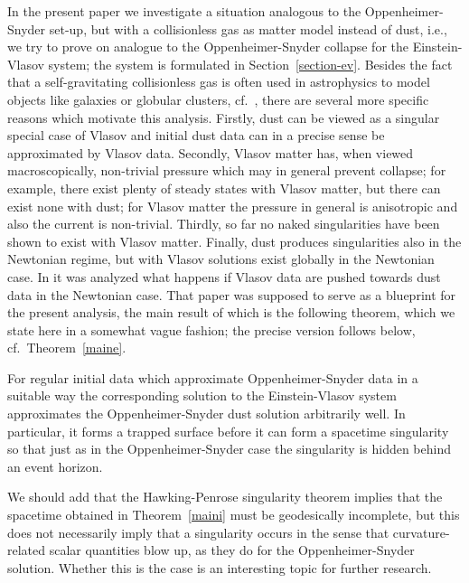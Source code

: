 \documentclass[11pt]{article}
\begin{document}
In the present paper we 
investigate a situation analogous to the Oppenheimer-Snyder
set-up, but with a collisionless gas as matter
model instead of dust, i.e., we try to prove on analogue
to the Oppenheimer-Snyder collapse for the Einstein-Vlasov system;
the system is formulated in Section~\ref{section-ev}.
Besides the fact that a self-gravitating collisionless gas is often used in
astrophysics to model objects like galaxies or globular clusters,
cf.~\cite{BT},
there are several more specific reasons which motivate this analysis.
Firstly, dust can be viewed as a
singular special case of Vlasov and initial dust data can in
a precise sense be approximated
by Vlasov data. Secondly, Vlasov matter has, when viewed macroscopically,
non-trivial pressure which may in general prevent collapse;
for example, there exist plenty of steady states
with Vlasov matter, but there can exist none with dust;
for Vlasov matter the pressure in general is anisotropic and also
the current is non-trivial.
Thirdly, so far no naked singularities
have been shown to exist with Vlasov matter.
Finally, dust produces singularities also in the Newtonian
regime, but with Vlasov solutions exist globally in the Newtonian
case. In \cite{RT} it was analyzed what happens if Vlasov data
are pushed towards dust data in the Newtonian case. That paper
was supposed to serve as a blueprint for the present analysis,
the main result of which is the following theorem, which we state
here in a somewhat vague fashion; the precise version follows below,
cf.~Theorem~\ref{maine}.

\begin{theorem}\label{maini}
  For regular initial data which approximate Oppenheimer-Snyder
  data in a suitable way 
  the corresponding solution to the Einstein-Vlasov system approximates the
  Oppenheimer-Snyder dust solution arbitrarily well. In particular, it forms
  a trapped surface before
  it can form a spacetime singularity so that just as
  in the Oppenheimer-Snyder case
  the singularity is hidden behind an event horizon.
\end{theorem}

We should add that the Hawking-Penrose singularity theorem \cite{pen}
implies that the spacetime obtained in Theorem~\ref{maini} must be geodesically
incomplete, but this does not necessarily imply that a singularity
occurs in the sense that curvature-related scalar quantities blow up,
as they do for the Oppenheimer-Snyder solution. Whether this is the case
is an interesting topic for further research.
\end{document}
